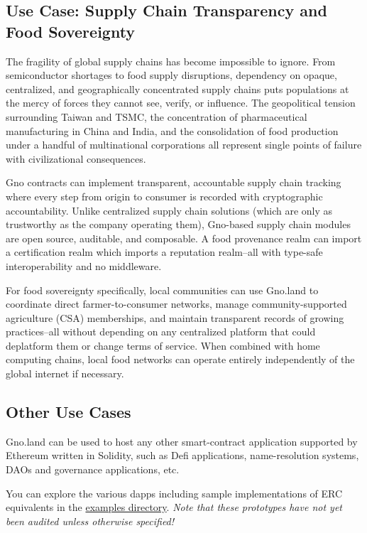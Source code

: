 \documentclass[12pt,a4paper]{article}
\begin{document}
\subsection{Use Case: Supply Chain Transparency and Food
Sovereignty}\label{use-case-supply-chain-transparency-and-food-sovereignty}

The fragility of global supply chains has become impossible to ignore.
From semiconductor shortages to food supply disruptions, dependency on
opaque, centralized, and geographically concentrated supply chains puts
populations at the mercy of forces they cannot see, verify, or
influence. The geopolitical tension surrounding Taiwan and TSMC, the
concentration of pharmaceutical manufacturing in China and India, and
the consolidation of food production under a handful of multinational
corporations all represent single points of failure with civilizational
consequences.

Gno contracts can implement transparent, accountable supply chain
tracking where every step from origin to consumer is recorded with
cryptographic accountability. Unlike centralized supply chain solutions
(which are only as trustworthy as the company operating them), Gno-based
supply chain modules are open source, auditable, and composable. A food
provenance realm can import a certification realm which imports a
reputation realm--all with type-safe interoperability and no middleware.

For food sovereignty specifically, local communities can use Gno.land to
coordinate direct farmer-to-consumer networks, manage
community-supported agriculture (CSA) memberships, and maintain
transparent records of growing practices--all without depending on any
centralized platform that could deplatform them or change terms of
service. When combined with home computing chains, local food networks
can operate entirely independently of the global internet if necessary.

\subsection{Other Use Cases}\label{other-use-cases}

Gno.land can be used to host any other smart-contract application
supported by Ethereum written in Solidity, such as Defi applications,
name-resolution systems, DAOs and governance applications, etc.

You can explore the various dapps including sample implementations of
ERC equivalents in the
\href{https://github.com/gnolang/gno/tree/master/examples/gno.land}{examples
directory}. \emph{Note that these prototypes have not yet been audited
unless otherwise specified!}
\end{document}
